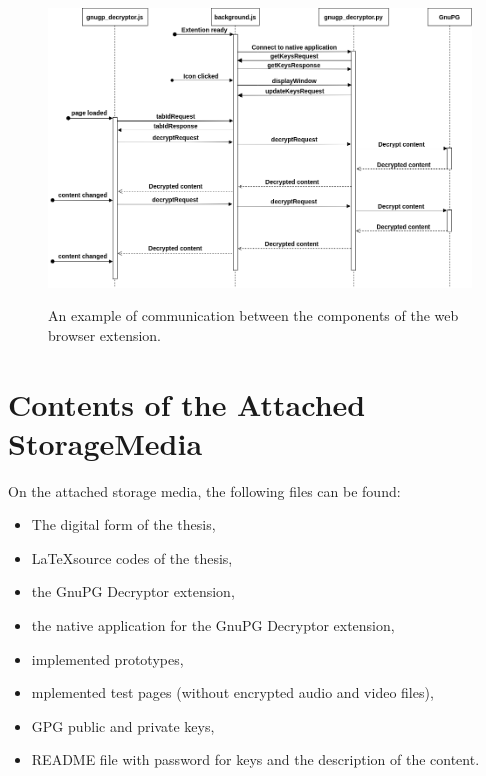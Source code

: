 \begin{figure}[H]
    \begin{center}
        \label{img:messageExample}
        \includegraphics[width=1.3\textwidth,angle=90]{obrazky-figures/sequence-messageExample.png}
        \caption{An example of communication between the components of the web browser extension.}
    \end{center}
\end{figure}

\chapter{Contents of the Attached StorageMedia}
On the attached storage media, the following files can be found:

\begin{itemize}
    \item The digital form of the thesis,
    \item \LaTeX source codes of the thesis,
    \item the GnuPG Decryptor extension,
    \item the native application for the GnuPG Decryptor extension,
    \item implemented prototypes,
    \item mplemented test pages (without encrypted audio and video files),
    \item GPG public and private keys,
	\item README file with password for keys and the description of the content.
\end{itemize}

